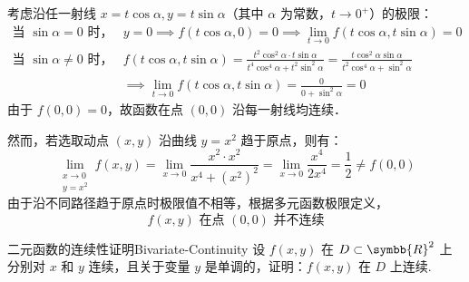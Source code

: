 \begin{myproof}
    考虑沿任一射线 $x = t \cos \alpha, y = t \sin \alpha$（其中 $\alpha$ 为常数，$t \to 0^{+}$）的极限：
    \begin{equation}
        \begin{aligned}
            \text{当 } \sin \alpha = 0 \text{ 时，}    & y = 0 \implies f(t \cos \alpha, 0) = 0 \implies \lim_{t \to 0} f(t \cos \alpha, t \sin \alpha) = 0                                                                                            \\
            \text{当 } \sin \alpha \neq 0 \text{ 时，} & f(t \cos \alpha, t \sin \alpha) = \frac{t^2 \cos^2 \alpha \cdot t \sin \alpha}{t^4 \cos^4 \alpha + t^2 \sin^2 \alpha} = \frac{t \cos^2 \alpha \sin \alpha}{t^2 \cos^4 \alpha + \sin^2 \alpha} \\
                                                    & \implies \lim_{t \to 0} f(t \cos \alpha, t \sin \alpha) = \frac{0}{0 + \sin^2 \alpha} = 0
        \end{aligned}
    \end{equation}
    由于 $f(0,0) = 0$，故函数在点 $(0,0)$ 沿每一射线均连续．

    然而，若选取动点 $(x, y)$ 沿曲线 $y = x^2$ 趋于原点，则有：
    \begin{equation}
        \lim_{\substack{x \to 0 \\ y = x^2}} f(x, y) = \lim_{x \to 0} \frac{x^2 \cdot x^2}{x^4 + (x^2)^2} = \lim_{x \to 0} \frac{x^4}{2x^4} = \frac{1}{2} \neq f(0,0)
    \end{equation}
    由于沿不同路径趋于原点时极限值不相等，根据多元函数极限定义，
    \begin{equation}
        \boxed{f(x, y) \text{ 在点 } (0,0) \text{ 并不连续}}
    \end{equation}
\end{myproof}

\begin{problem}{二元函数的连续性证明}{Bivariate-Continuity}
    设 $f(x,y)$ 在 $D \subset \symbb{R}^2$ 上分别对 $x$ 和 $y$ 连续，且关于变量 $y$ 是单调的，证明：$f(x,y)$ 在 $D$ 上连续.
\end{problem}

